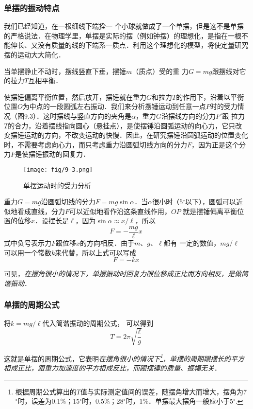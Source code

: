 \subsubsection{单摆的振动特点}

我们已经知道，在一根细线下端拴一
个小球就做成了一个单摆，但是这不是单摆的严格说法．在物理学里，单摆是实际的摆（例如钟摆）的理想化，是指在一根不
能伸长、又没有质量的线的下端系一质点．利用这个理想化的模型，将使定量研究摆的运动大大简化．

当单摆静止不动时，摆线竖直下垂，摆锤$m$（质点）受的重
力$G=mg$跟摆线对它的拉力$T$互相平衡．

使摆锤偏离平衡位置，然后放开，摆锤就在重力$G$和拉力$T$的作用下，沿着以平衡位置$O$为中点的一段圆弧左右振动．我们来分析摆锤运动到任意一点$P$时的受力情况（图9.3）．这时摆线与竖直方向的夹角是$\alpha$，重力$G$沿摆线方向的分力$F'$跟
拉力$T$的合力，沿着摆线指向圆心（悬挂点），是使摆锤沿圆弧运动的向心力，它只改变摆锤运动的方向，不改变运动的快慢．因此，在研究摆锤沿圆弧运动的位置变化时，不需要考虑向心力，而只考虑重力沿圆弧切线方向的分力$F$，因为正是这个分力$F$是使摆锤振动的回复力．
\begin{figure}[htp]\centering
    \texttt{[image: fig/9-3.png]}
    \caption{单摆运动时的受力分析}
    \end{figure}
    
重力$G=mg$沿圆弧切线的分力$F=mg\sin\alpha$．当$\alpha$很小时（5$^\circ$以下），圆弧可以近似地看成直线，分力$F$可以近似地看作沿这条直线作用，$OP$ 就是摆锤偏离平衡位置的位移$x$．设摆长是$\ell$，因为$\sin\alpha\approx x/\ell$，所以
\[F=-\frac{mg}{\ell}x\]
式中负号表示力$F$跟位移$x$的方向相反．由于$m$、$g$、$\ell$都有
一定的数值，$mg/\ell$
可以用一个常数$k$来代替，所以上式可以写成
\[F=-kx\]

可见，\textit{在摆角很小的情况下，单摆振动时回复力限位移成正比而方向相反，是做简谐振动}．

\subsubsection{单摆的周期公式}

将$k=mg/\ell$代入简谐振动的周期公式，
可以得到
\[T=2\pi\sqrt{\frac{\ell}{g}}\]

这就是单摆的周期公式，它表明\textit{在摆角很小的情况下\footnote{根据周期公式算出的$T$值与实际测定值间的误差，随摆角增大而增大，摆角为7$^\circ$时，误差为0.1\%；15$^\circ$时，0.5\%；28$^\circ$时，1\%．单摆最大摆角一般应小于5$^\circ$.}，单摆的周期跟摆长的平方根成正比，跟重力加速度的平方根成反比，而跟摆锤的质量、振幅无关}．

